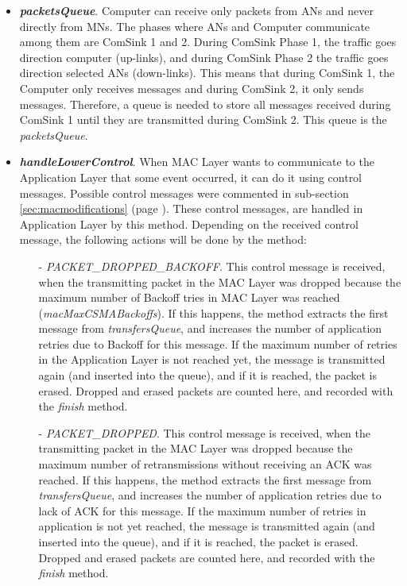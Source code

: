 \begin{itemize}
  \item \textbf{\textit{packetsQueue}}. Computer can receive only packets from \acp{AN} and never directly from \acp{MN}. The phases where \acp{AN}
  and Computer communicate among them are ComSink 1 and 2. During ComSink Phase 1, the traffic goes direction computer (up-links), and during
  ComSink Phase 2 the traffic goes direction selected \acp{AN} (down-links). This means that during ComSink 1, the Computer only receives messages
  and during ComSink 2, it only sends messages. Therefore, a queue is needed to store all messages received during ComSink 1 until they are
  transmitted during ComSink 2. This queue is the \textit{packetsQueue}.

  \item \textbf{\textit{handleLowerControl}}. When \ac{MAC} Layer wants to communicate to the Application Layer that some event occurred, it can do 
  it using control messages. Possible control messages were commented in sub-section \ref{sec:macmodifications} (page \pageref{sec:macmodifications}).
  These control messages, are handled in Application Layer by this method. Depending on the received control message, the following actions will
  be done by the method:
  \begin{itemize}
    \item[-] \textit{PACKET\_DROPPED\_BACKOFF}. This control message is received, when the transmitting packet in the \ac{MAC} Layer was dropped 
    because the maximum number of Backoff tries in \ac{MAC} Layer was reached (\textit{macMaxCSMABackoffs}). If this happens, the method extracts 
    the first message from \textit{transfersQueue}, and increases the number of application retries due to Backoff for this message. If the maximum 
    number of retries in the Application Layer is not reached yet, the message is transmitted again (and inserted into the queue), and if it is 
    reached, the packet is erased. Dropped and erased packets are counted here, and recorded with the \textit{finish} method.

    \item[-] \textit{PACKET\_DROPPED}. This control message is received, when the transmitting packet in the \ac{MAC} Layer was dropped because
    the maximum number of retransmissions without receiving an \ac{ACK} was reached. If this happens, the method extracts the first message from
    \textit{transfersQueue}, and increases the number of application retries due to lack of \ac{ACK} for this message. If the maximum number of 
    retries in application is not yet reached, the message is transmitted again (and inserted into the queue), and if it is reached, the packet 
    is erased. Dropped and erased packets are counted here, and recorded with the \textit{finish} method.


\end{itemize}
\end{itemize}
